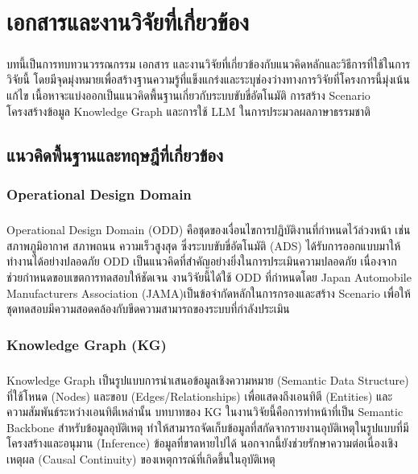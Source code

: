 \chapter{เอกสารและงานวิจัยที่เกี่ยวข้อง}

\paragraph{}
บทนี้เป็นการทบทวนวรรณกรรม เอกสาร และงานวิจัยที่เกี่ยวข้องกับแนวคิดหลักและวิธีการที่ใช้ในการวิจัยนี้ โดยมีจุดมุ่งหมายเพื่อสร้างฐานความรู้ที่แข็งแกร่งและระบุช่องว่างทางการวิจัยที่โครงการนี้มุ่งเน้นแก้ไข เนื้อหาจะแบ่งออกเป็นแนวคิดพื้นฐานเกี่ยวกับระบบขับขี่อัตโนมัติ การสร้าง Scenario โครงสร้างข้อมูล Knowledge Graph และการใช้ LLM ในการประมวลผลภาษาธรรมชาติ

\section{แนวคิดพื้นฐานและทฤษฎีที่เกี่ยวข้อง}

\subsection{Operational Design Domain}\label{sec:ODD}
\paragraph{}
Operational Design Domain (ODD) คือชุดของเงื่อนไขการปฏิบัติงานที่กำหนดไว้ล่วงหน้า เช่น สภาพภูมิอากาศ สภาพถนน ความเร็วสูงสุด ซึ่งระบบขับขี่อัตโนมัติ (ADS) ได้รับการออกแบบมาให้ทำงานได้อย่างปลอดภัย ODD เป็นแนวคิดที่สำคัญอย่างยิ่งในการประเมินความปลอดภัย เนื่องจากช่วยกำหนดขอบเขตการทดสอบให้ชัดเจน งานวิจัยนี้ได้ใช้ ODD ที่กำหนดโดย Japan Automobile Manufacturers Association (JAMA)เป็นข้อจำกัดหลักในการกรองและสร้าง Scenario เพื่อให้ชุดทดสอบมีความสอดคล้องกับขีดความสามารถของระบบที่กำลังประเมิน

\subsection{Knowledge Graph (KG)}\label{sec:KG}
\paragraph{}
Knowledge Graph เป็นรูปแบบการนำเสนอข้อมูลเชิงความหมาย (Semantic Data Structure) ที่ใช้โหนด (Nodes) และขอบ (Edges/Relationships) เพื่อแสดงถึงเอนทิตี (Entities) และความสัมพันธ์ระหว่างเอนทิตีเหล่านั้น บทบาทของ KG ในงานวิจัยนี้คือการทำหน้าที่เป็น Semantic Backbone สำหรับข้อมูลอุบัติเหตุ ทำให้สามารถจัดเก็บข้อมูลที่สกัดจากรายงานอุบัติเหตุในรูปแบบที่มีโครงสร้างและอนุมาน (Inference) ข้อมูลที่ขาดหายไปได้ นอกจากนี้ยังช่วยรักษาความต่อเนื่องเชิงเหตุผล (Causal Continuity) ของเหตุการณ์ที่เกิดขึ้นในอุบัติเหตุ

